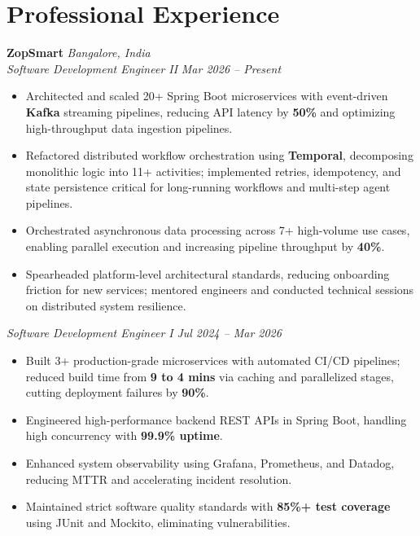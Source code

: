 \documentclass[a4paper,10pt]{article}
\begin{document}
\section{Professional Experience}

\vspace{1pt}
\textbf{ZopSmart} \hfill \textit{Bangalore, India} \\
\textit{Software Development Engineer II} \hfill \textit{Mar 2026 – Present}
\begin{itemize}[label={\textbullet}, itemsep=0.02em, leftmargin=*]
\item Architected and scaled 20+ Spring Boot microservices with event-driven \textbf{Kafka} streaming pipelines, reducing API latency by \textbf{50\%} and optimizing high-throughput data ingestion pipelines.
\item Refactored distributed workflow orchestration using \textbf{Temporal}, decomposing monolithic logic into 11+ activities; implemented retries, idempotency, and state persistence critical for long-running workflows and multi-step agent pipelines.
\item Orchestrated asynchronous data processing across 7+ high-volume use cases, enabling parallel execution and increasing pipeline throughput by \textbf{40\%}.
\item Spearheaded platform-level architectural standards, reducing onboarding friction for new services; mentored engineers and conducted technical sessions on distributed system resilience.
\end{itemize}

\vspace{2pt}
\textit{Software Development Engineer I} \hfill \textit{Jul 2024 – Mar 2026}
\begin{itemize}[label={\textbullet}, itemsep=0.02em, leftmargin=*]
\item Built 3+ production-grade microservices with automated CI/CD pipelines; reduced build time from \textbf{9 to 4 mins} via caching and parallelized stages, cutting deployment failures by \textbf{90\%}.
\item Engineered high-performance backend REST APIs in Spring Boot, handling high concurrency with \textbf{99.9\% uptime}.
\item Enhanced system observability using Grafana, Prometheus, and Datadog, reducing MTTR and accelerating incident resolution.
\item Maintained strict software quality standards with \textbf{85\%+ test coverage} using JUnit and Mockito, eliminating vulnerabilities.
\end{itemize}
\end{document}

